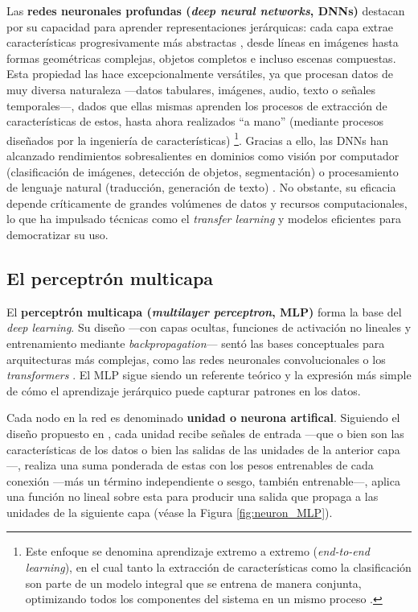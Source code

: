 Las \textbf{redes neuronales profundas (\textit{deep neural networks}, DNNs)} destacan por su capacidad para 
aprender representaciones jerárquicas: cada capa extrae características progresivamente más abstractas 
\cite{lecun2015}, desde líneas en imágenes hasta formas geométricas complejas, objetos completos e incluso 
escenas compuestas.
Esta propiedad las hace excepcionalmente versátiles, ya que procesan datos de muy diversa naturaleza ---datos 
tabulares, imágenes, audio, texto o señales temporales---, dados que ellas mismas aprenden los procesos de 
extracción de características de estos, hasta ahora realizados ``a mano'' (mediante procesos diseñados por la 
ingeniería de características) \cite{rusell2021} \footnote{Este enfoque se denomina aprendizaje extremo a 
extremo (\textit{end-to-end learning}), en el cual tanto la extracción de características como la 
clasificación son parte de un modelo integral que se entrena de manera conjunta, optimizando todos los 
componentes del sistema en un mismo proceso \cite{rusell2021}.}. Gracias a ello, las DNNs han alcanzado 
rendimientos sobresalientes en dominios como visión por computador (clasificación de imágenes, detección de 
objetos, segmentación) o procesamiento de lenguaje natural (traducción, generación de texto) 
\cite{redhat2024DeepLearningDefinition}.
No obstante, su eficacia depende críticamente de grandes volúmenes de datos y recursos computacionales, lo que 
ha impulsado técnicas como el \textit{transfer learning} y modelos eficientes para democratizar su uso.


\subsection{El perceptrón multicapa}

El \textbf{perceptrón multicapa (\textit{multilayer perceptron}, MLP)} forma la base del \textit{deep 
learning}. Su diseño ---con capas ocultas, funciones de activación no lineales y entrenamiento  mediante 
\textit{backpropagation}--- sentó las bases conceptuales para arquitecturas más complejas, como las redes 
neuronales convolucionales o los \textit{transformers} \cite{murphy2022}. El MLP sigue siendo un referente 
teórico y la expresión más simple de cómo el aprendizaje jerárquico puede capturar patrones en los datos. 

Cada nodo en la red es denominado \textbf{unidad o neurona artifical}. Siguiendo el diseño propuesto en 
\cite{mcculloch1943,rosenblatt1958}, cada unidad recibe señales de entrada ---que o bien son las 
características de los datos o bien las salidas de las unidades de la anterior capa---, realiza una suma 
ponderada de estas con los pesos entrenables de cada conexión ---más un término independiente o sesgo, también 
entrenable---, aplica una función no lineal sobre esta para producir una salida que propaga a las unidades de 
la siguiente capa (véase la Figura \ref{fig:neuron_MLP}).

